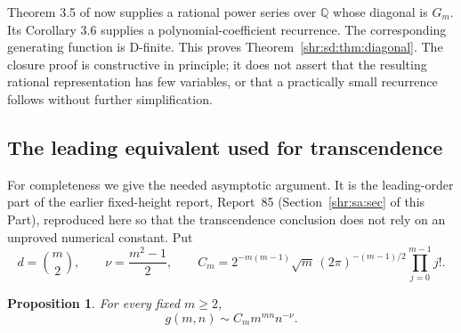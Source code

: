 \documentclass[11pt,letterpaper]{article}
\numberwithin{equation}{section}
\newtheorem{proposition}[theorem]{Proposition}
\theoremstyle{definition}
\newcommand{\Q}{\mathbb Q}
\newcommand{\1}{\mathbf 1}
\begin{document}
Theorem 3.5 of \cite{BLS} now supplies a rational power series over $\Q$ whose diagonal is $G_m$. Its Corollary 3.6 supplies a polynomial-coefficient recurrence. The corresponding generating function is D-finite. This proves Theorem~\ref{shr:sd:thm:diagonal}. The closure proof is constructive in principle; it does not assert that the resulting rational representation has few variables, or that a practically small recurrence follows without further simplification.

\subsection{The leading equivalent used for transcendence}
For completeness we give the needed asymptotic argument. It is the leading-order part of the earlier fixed-height report, Report~85 (Section~\ref{shr:sa:sec} of this
Part), reproduced here so that the transcendence conclusion does not rely on an unproved numerical constant. Put
\[
 d=\binom m2,\qquad \nu=\frac{m^2-1}{2},\qquad
 C_m=2^{-m(m-1)}\sqrt m\,(2\pi)^{-(m-1)/2}
       \prod_{j=0}^{m-1}j!.
\]
\begin{proposition}\label{shr:sd:prop:asymptotic}
For every fixed $m\ge2$,
\begin{equation}\label{shr:sd:eq:asymptotic}
 g(m,n)\sim C_m m^{mn}n^{-\nu}.
\end{equation}
\end{proposition}
\end{document}
